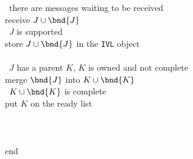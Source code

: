 \begin{enumerate}
\begin{tabbing}
\>\> \END\ \IF\ \\
\> \END\ \WHILE\ \\
\> \WHILE\ there are messages waiting to be received \\
\>\> receive $J \cup \bnd{J}$ \\
\>\> \IF\ $J$ is supported \THEN\ \\
\>\>\> store $J \cup \bnd{J}$ in the {\tt IVL} object \\
\>\> \END\ \IF \\
\>\> \IF\ $J$ has a parent $K$, $K$ is owned and not complete \THEN\ \\
\>\>\> merge $\bnd{J}$ into $K \cup \bnd{K}$ \\
\>\>\> \IF\ $K \cup \bnd{K}$ is complete \THEN\ \\
\>\>\>\> put $K$ on the ready list \\
\>\>\> \END\ \IF \\
\>\> \END\ \IF \\
\> \END\ \WHILE \\
end \WHILE\ 
\end{tabbing}
\end{enumerate}
